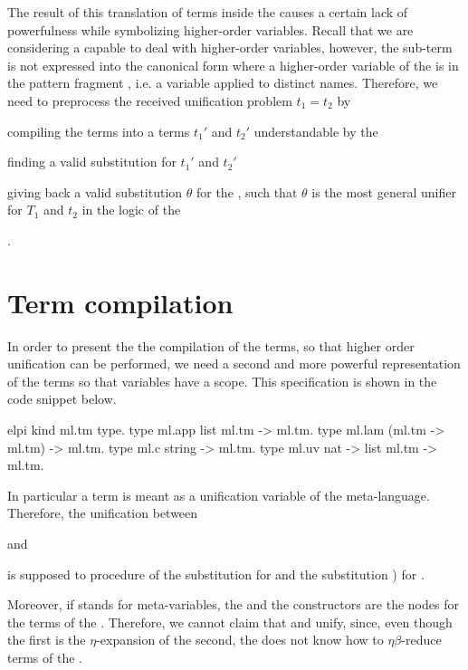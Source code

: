 \documentclass{rapport}
\begin{document}
The result of this translation of terms inside the \ml causes a certain lack of
powerfulness while symbolizing higher-order variables. Recall that we are
considering a \ml capable to deal with higher-order variables, however, the
sub-term  is not expressed into the canonical form where a
higher-order variable of the \ml is in the pattern fragment \cite{miller1991},
i.e. a variable applied to distinct names. Therefore, we need to preprocess the
received unification problem $t_1 = t_2$ by 
\begin{inlinelist}
  \item compiling the terms into a terms $t_1'$ and $t_2'$ understandable by the
  \ml
  \item finding a valid substitution for $t_1'$ and $t_2'$ 
  \item giving back a valid substitution $\theta$ for the \ol, such that $\theta$
  is the most general unifier for $T_1$ and $t_2$ in the logic of the \ol
\end{inlinelist}.

\section{Term compilation}

In order to present the the compilation of the \ol terms, so that higher order
unification can be performed, we need a second and more powerful representation
of the \ol terms so that variables have a scope. This specification is shown
in the code snippet below.  

\begin{mintedTcolorbox}{elpi}
  kind ml.tm type.
  type ml.app list ml.tm -> ml.tm.
  type ml.lam (ml.tm -> ml.tm) -> ml.tm.
  type ml.c string -> ml.tm.
  type ml.uv nat -> list ml.tm -> ml.tm.
\end{mintedTcolorbox}

\noindent In particular a  term is meant as a unification variable
of the meta-language. Therefore, the unification between 


and


is supposed to procedure of the substitution  for  and the substitution ) for
.

Moreover, if  stands for meta-variables, the  and the
 constructors are the nodes for the terms of the \ol. Therefore, we
cannot claim that  and 
unify, since, even though the first is the $\eta$-expansion of the second, the
\ml does not know how to $\eta\beta$-reduce terms of the \ol.
\end{document}
